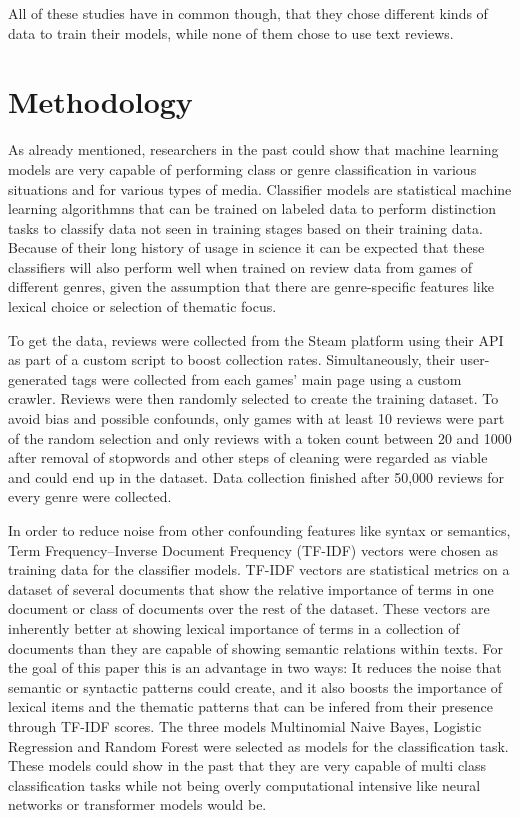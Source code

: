 \documentclass[11pt, a4paper]{article}
\begin{document}
All of these studies have in common though, that they chose different kinds of data to train their models, while none
of them chose to use text reviews.


\section{Methodology}\label{sec:methodology}
As already mentioned, researchers in the past could show that machine learning models are very capable of performing
class or genre classification in various situations and for various types of media.
Classifier models are statistical machine learning algorithmns that can be trained on labeled data to perform
distinction tasks to classify data not seen in training stages based on their training data.
Because of their long history of usage in science it can be expected that these classifiers will also perform well when
trained on review data from games of different genres, given the assumption that there are genre-specific features like
lexical choice or selection of thematic focus.

To get the data, reviews were collected from the Steam platform using their API as part of a custom script to boost
collection rates.
Simultaneously, their user-generated tags were collected from each games' main page using a custom crawler.
Reviews were then randomly selected to create the training dataset.
To avoid bias and possible confounds, only games with at least 10 reviews were part of the random selection and only
reviews with a token count between 20 and 1000 after removal of stopwords and other steps of cleaning were regarded
as viable and could end up in the dataset.
Data collection finished after 50,000 reviews for every genre were collected.

In order to reduce noise from other confounding features like syntax or semantics, Term Frequency--Inverse Document
Frequency (TF-IDF) vectors were chosen as training data for the classifier models.
TF-IDF vectors are statistical metrics on a dataset of several documents that show the relative importance of terms
in one document or class of documents over the rest of the dataset.
These vectors are inherently better at showing lexical importance of terms in a collection of documents than they are
capable of showing semantic relations within texts.
For the goal of this paper this is an advantage in two ways:
It reduces the noise that semantic or syntactic patterns could create, and it also boosts the importance of lexical
items and the thematic patterns that can be infered from their presence through TF-IDF scores.
The three models Multinomial Naive Bayes, Logistic Regression and Random Forest were selected as models for the
classification task.
These models could show in the past that they are very capable of multi class classification tasks while not being
overly computational intensive like neural networks or transformer models would be.
\end{document}
